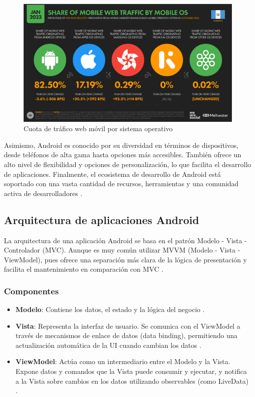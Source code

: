 \begin{figure} [h]
    \centering
    \includegraphics[width=0.5\linewidth]{figuras/mobile_web_traffic.png}
    \caption{Cuota de tráfico web móvil por sistema operativo}
    \label{fig:enter-label}
\end{figure}

Asimismo, Android es conocido por su diversidad en términos de dispositivos, desde teléfonos de alta gama hasta opciones más accesibles. También ofrece un alto nivel de flexibilidad y opciones de personalización, lo que facilita el desarrollo de aplicaciones. Finalmente, el ecosistema de desarrollo de Android está soportado con una vasta cantidad de recursos, herramientas y una comunidad activa de desarrolladores \cite{AnonimoAndroid}.

\subsection{Arquitectura de aplicaciones Android}
La arquitectura de una aplicación Android se basa en el patrón Modelo - Vista - Controlador (MVC). Aunque es muy común utilizar MVVM (Modelo - Vista - ViewModel), pues ofrece una separación más clara de la lógica de presentación y facilita el mantenimiento en comparación con MVC \cite{RamosSF}.

\subsubsection{Componentes}
\begin{itemize}
    \item \textbf{Modelo}: Contiene los datos, el estado y la lógica del negocio \cite{Bhadoria2013}.
    \item \textbf{Vista}: Representa la interfaz de usuario. Se comunica con el ViewModel a través de mecanismos de enlace de datos (data binding), permitiendo una actualización automática de la UI cuando cambian los datos \cite{Bhadoria2013}.
    \item \textbf{ViewModel}: Actúa como un intermediario entre el Modelo y la Vista. Expone datos y comandos que la Vista puede consumir y ejecutar, y notifica a la Vista sobre cambios en los datos utilizando observables (como LiveData) \cite{Bhadoria2013}.
\end{itemize}

